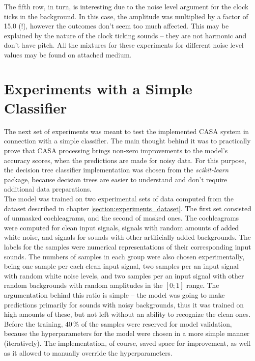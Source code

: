 The fifth row, in turn, is interesting due to the noise level argument for the clock ticks in the background. In this case, the amplitude was multiplied by a factor of 15.0 (!), however the outcomes don't seem too much affected. This may be explained by the nature of the clock ticking sounds -- they are not harmonic and don't have pitch. All the mixtures for these experiments for different noise level values may be found on attached medium.

\section{Experiments with a Simple Classifier}

The next set of experiments was meant to test the implemented CASA system in connection with a simple classifier. The main thought behind it was to practically prove that CASA processing brings non-zero improvements to the model's accuracy scores, when the predictions are made for noisy data. For this purpose, the decision tree classifier implementation was chosen from the \textit{scikit-learn} \cite{scikit-learn} package, because decision trees are easier to understand and don't require additional data preparations.\\

The model was trained on two experimental sets of data computed from the dataset described in chapter \ref{section:experiments_dataset}. The first set consisted of unmasked cochleagrams, and the second of masked ones. The cochleagrams were computed for clean input signals, signals with random amounts of added white noise, and signals for sounds with other artificially added backgrounds. The labels for the samples were numerical representations of their corresponding input sounds. The numbers of samples in each group were also chosen experimentally, being one sample per each clean input signal, two samples per an input signal with random white noise levels, and two samples per an input signal with other random backgrounds with random amplitudes in the $[0; 1]$ range. The argumentation behind this ratio is simple -- the model was going to make predictions primarily for sounds with noisy backgrounds, thus it was trained on high amounts of these, but not left without an ability to recognize the clean ones.\\

Before the training, $40\,\%$ of the samples were reserved for model validation, because the hyperparameters for the model were chosen in a more simple manner (iteratively). The implementation, of course, saved space for improvement, as well as it allowed to manually override the hyperparameters.\\

